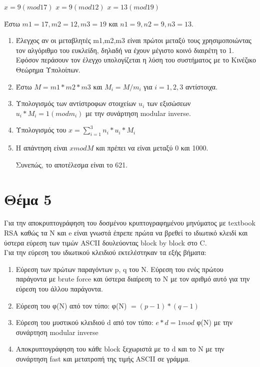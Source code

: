 \documentclass[a4paper, 11pt]{article}
\newcommand{\lt}{\latintext}
\begin{document}
$ x = 9 (mod 17)$
$ x = 9 (mod 12)$
$ x = 13 (mod 19)$

Έστω $ m1 = 17, m2 = 12, m3 = 19$ και $ n1 = 9, n2 = 9, n3 = 13 $.

\begin{enumerate}

\item Έλεγχος αν οι μεταβλητές {\lt m1,m2,m3} είναι πρώτοι μεταξύ τους χρησιμοποιώντας τον αλγόριθμο του ευκλείδη, δηλαδή να έχουν μέγιστο κοινό διαιρέτη το 1. Εφόσον περάσουν τον έλεγχο υπολογίζεται η λύση του συστήματος με το Κινέζικο Θεώρημα Υπολοίπων.

\item Έστω $ M = m1 * m2 * m3 $ και $ M_i = M / m_i $ για $ i = 1,2,3 $ αντίστοιχα.

\item Υπολογισμός των αντίστροφων στοιχείων $ u_i $ των εξισώσεων $ u_i * M_i = 1 (mod m_i) $ με την συνάρτηση {\lt modular inverse}.

\item Υπολογισμός του $ x = \sum_{i=1}^{3} n_i * u_i * M_i $

\item Η απάντηση είναι $ x mod M $ και πρέπει να είναι μεταξύ 0 και 1000. 

Συνεπώς, το αποτέλεσμα είναι το 621.

\end{enumerate}

\section*{Θέμα 5}


Για την αποκρυπτογράφηση του δοσμένου κρυπτογραφημένου μηνύματος με {\lt textbook RSA} καθώς τα {\lt N} και {\lt e} είναι γνωστά έπρεπε πρώτα να βρεθεί το ιδιωτικό κλειδί και ύστερα εύρεση των τιμών {\lt ASCII} δουλεύοντας {\lt block by block} στο {\lt C}. \\

Για την εύρεση του ιδιωτικού κλειδιού εκτελέστηκαν τα εξής βήματα:

\begin{enumerate}

\item Εύρεση των πρώτων παραγόντων {\lt p, q} του {\lt N}. Εύρεση του ενός πρώτου παράγοντα με {\lt brute force} και ύστερα διαίρεση το {\lt N} με τον αριθμό αυτό για την εύρεση του άλλου παράγοντα.

\item Εύρεση του φ(Ν) από τον τύπο: φ(Ν) $ = (p - 1) * (q - 1) $ 

\item Εύρεση του μυστικού κλειδιού {\lt d} από τον τύπο: $ e * d = 1 mod $ φ(Ν) με την συνάρτηση {\lt modular inverse}

\item Αποκρυπτογράφηση του κάθε {\lt block} ξεχωριστά με το {\lt d } και το {\lt N}  με την συνάρτηση {\lt fast} και μετατροπή της τιμής {\lt ASCII} σε γράμμα.

\end{enumerate}
\end{document}
